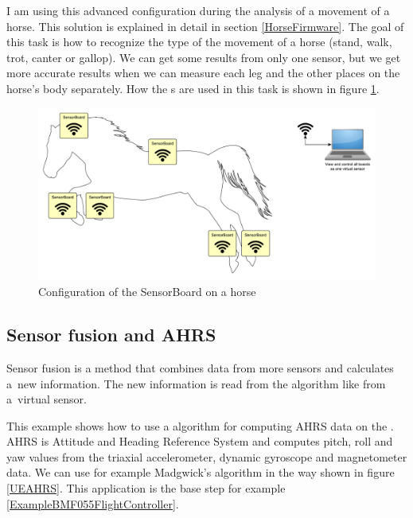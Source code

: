 I am using this advanced configuration during the analysis of a movement of a horse. This solution is explained in detail in section \ref{HorseFirmware}. The goal of this task is how to recognize the type of the movement of a horse (stand, walk, trot, canter or gallop). We can get some results from only one sensor, but we get more accurate results when we can measure each leg and the other places on the horse's body separately. How the s are used in this task is shown in figure \ref{UELoggingHorse}.

\begin{figure}
    \centering
    \caption{Configuration of the SensorBoard on a horse}
    \label{UELoggingHorse}
    \includegraphics[width=\linewidth]{img/UsageExamplesLoggerHorse.pdf}
\end{figure}

\subsection{Sensor fusion and \ac{AHRS}}
\label{ExampleAHRS}
Sensor fusion  is a method that combines data from more sensors and calculates a~new information. The new information is read from the  algorithm like from a~virtual sensor. \cite{SensorFusion}

This example shows how to use a  algorithm for computing \ac{AHRS} data on the . \ac{AHRS} is Attitude and Heading Reference System and computes pitch, roll and yaw values from the triaxial accelerometer, dynamic gyroscope and magnetometer data. We can use for example Madgwick's algorithm \cite{MadgwickAHRS} in the way shown in figure \ref{UEAHRS}. This application is the base step for example \ref{ExampleBMF055FlightController}.

